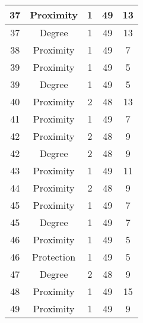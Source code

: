 \documentclass[results.tex]{subfiles}
\begin{document}
\begin{center}
\begin{tabular}{| c || c | c | c | c |}
    37 & Proximity & 1 & 49 & 13 \\ 
    \hline
    37 & Degree & 1 & 49 & 13 \\ 
    \hline
    38 & Proximity & 1 & 49 & 7 \\ 
    \hline
    39 & Proximity & 1 & 49 & 5 \\ 
    \hline
    39 & Degree & 1 & 49 & 5 \\ 
    \hline
    40 & Proximity & 2 & 48 & 13 \\ 
    \hline
    41 & Proximity & 1 & 49 & 7 \\ 
    \hline
    42 & Proximity & 2 & 48 & 9 \\ 
    \hline
    42 & Degree & 2 & 48 & 9 \\ 
    \hline
    43 & Proximity & 1 & 49 & 11 \\ 
    \hline
    44 & Proximity & 2 & 48 & 9 \\ 
    \hline
    45 & Proximity & 1 & 49 & 7 \\ 
    \hline
    45 & Degree & 1 & 49 & 7 \\ 
    \hline
    46 & Proximity & 1 & 49 & 5 \\ 
    \hline
    46 & Protection & 1 & 49 & 5 \\ 
    \hline
    47 & Degree & 2 & 48 & 9 \\ 
    \hline
    48 & Proximity & 1 & 49 & 15 \\ 
    \hline
    49 & Proximity & 1 & 49 & 9 \\ 
    \hline   \end{tabular}
\end{center}
\end{document}
